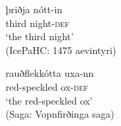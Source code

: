 \documentclass[output=paper,colorlinks,citecolor=brown]{langscibook}
\begin{document}
\begin{multicols}{2}{
\begin{exe}
\ex \label{Imim}   
    \begin{xlist}
      \ex\gll  þriðja nótt-in   \\ 
       third night-\textsc{def} \\  
       \glt `the third night' \\ (IcePaHC: 1475 aevintyri)      

      \ex\gll   rauðflekkótta  uxa-nn     \\
      red-speckled ox-\textsc{def}   \\
      \glt `the red-speckled ox' \\ (Saga: Vopnfirðinga saga) 
    \end{xlist}  
\end{exe} }
\end{multicols}
 
\end{document}
